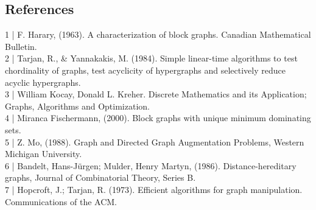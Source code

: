 \documentclass{memoir}
\begin{document}

\vfill
\subsection{References}

1 | F. Harary, (1963). A characterization of block graphs. Canadian Mathematical Bulletin.\\
2 | Tarjan, R., & Yannakakis, M. (1984). Simple linear-time algorithms to test chordinality of graphs, test acyclicity of hypergraphs and selectively reduce acyclic hypergraphs.\\
3 | William Kocay, Donald L. Kreher. Discrete Mathematics and its Application; Graphs, Algorithms and Optimization.\\
4 | Miranca Fischermann, (2000). Block graphs with unique minimum dominating sets.\\
5 | Z. Mo, (1988). Graph and Directed Graph Augmentation Problems, Western Michigan University.\\
6 | Bandelt, Hans-Jürgen; Mulder, Henry Martyn, (1986). Distance-hereditary graphs, Journal of Combinatorial Theory, Series B.\\
7 | Hopcroft, J.; Tarjan, R. (1973). Efficient algorithms for graph manipulation. Communications of the ACM.
\end{document}
